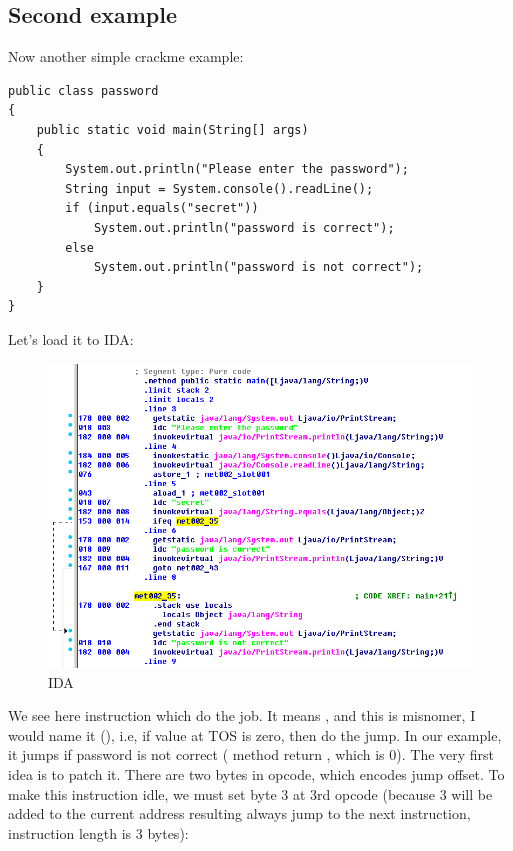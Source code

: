 \subsection{Second example}

Now another simple crackme example:

\begin{lstlisting}
public class password
{
	public static void main(String[] args)
	{
		System.out.println("Please enter the password");
		String input = System.console().readLine();
		if (input.equals("secret"))
			System.out.println("password is correct");
		else
			System.out.println("password is not correct");
	}
}
\end{lstlisting}

Let's load it to IDA:

\begin{figure}[H]
\centering
\includegraphics[scale=\FigScale]{Java_and_NET/java/13_patching/2/1.png}
\caption{IDA}
\end{figure}

We see here  instruction which do the job.
It means , and this is misnomer, I would name it  (), i.e, 
if value at \ac{TOS} is zero, then do the jump.
In our example, it jumps if password is not correct ( method return , which is 0).
The very first idea is to patch it.
There are two bytes in  opcode, which encodes jump offset.
To make this instruction idle, we must set byte 3 at 3rd opcode
(because 3 will be added to the current address resulting always jump to the next instruction,
 instruction length is 3 bytes):

